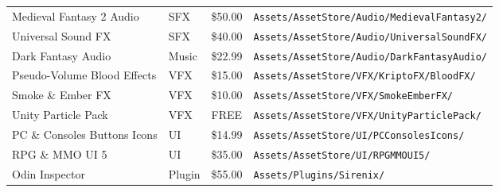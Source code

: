 \begin{table}[!h]
\begin{center}
\begin{tabular}{ >{\small}w{l}{11em} >{\small}w{c}{4em} >{\small}w{c}{3em} m{13em} }
        Medieval Fantasy 2 Audio     & SFX       &  \$50.00 & \texttt{\tiny Assets/AssetStore/Audio/MedievalFantasy2/} \\ 
        Universal Sound FX           & SFX       &  \$40.00 & \texttt{\tiny Assets/AssetStore/Audio/UniversalSoundFX/} \\
        \midrule
        Dark Fantasy Audio           & Music     &  \$22.99 & \texttt{\tiny Assets/AssetStore/Audio/DarkFantasyAudio/} \\
        \midrule
        Pseudo-Volume Blood Effects  & VFX       &  \$15.00 & \texttt{\tiny Assets/AssetStore/VFX/KriptoFX/BloodFX/}   \\ 
        Smoke \& Ember FX            & VFX       &  \$10.00 & \texttt{\tiny Assets/AssetStore/VFX/SmokeEmberFX/}       \\ 
        Unity Particle Pack          & VFX       &     FREE & \texttt{\tiny Assets/AssetStore/VFX/UnityParticlePack/}  \\
        \midrule
        PC \& Consoles Buttons Icons & UI        &  \$14.99 & \texttt{\tiny Assets/AssetStore/UI/PCConsolesIcons/}     \\ 
        RPG \& MMO UI 5              & UI        &  \$35.00 & \texttt{\tiny Assets/AssetStore/UI/RPGMMOUI5/}           \\
        \midrule
        Odin Inspector               & Plugin    &  \$55.00 & \texttt{\tiny Assets/Plugins/Sirenix/}                   \\ 
        \bottomrule
      \end{tabular}
    \end{center}
  \end{table}
